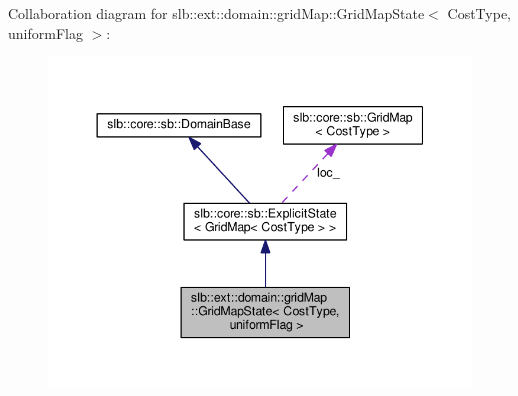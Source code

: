 Collaboration diagram for slb\+:\+:ext\+:\+:domain\+:\+:grid\+Map\+:\+:Grid\+Map\+State$<$ Cost\+Type, uniform\+Flag $>$\+:\nopagebreak
\begin{figure}[H]
\begin{center}
\leavevmode
\includegraphics[width=344pt]{structslb_1_1ext_1_1domain_1_1gridMap_1_1GridMapState__coll__graph}
\end{center}
\end{figure}

